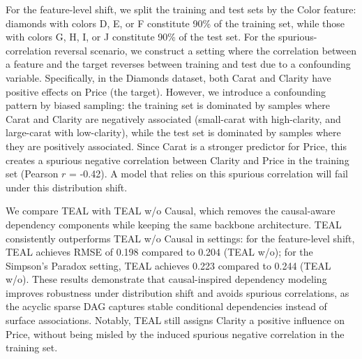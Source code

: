 \documentclass[conference]{IEEEtran}
\newcommand{\rln}[1]{{\color{black}#1}}
\newcommand{\rlend}[1]{{\color{black}#1}}
\newcommand{\rlx}[1]{\color{black}#1}
\newcommand{\syfix}[1]{{\color{black}#1}}
\newcommand{\syic}[1]{{\color{black}#1}}
\newcommand*{\ourmodel}{TEAL}
\begin{document}
\rln{
For the feature-level shift, we split the training and test sets by the Color feature: diamonds with colors D, E, or F constitute 90\% of the training set, while those with colors G, H, I, or J constitute 90\% of the test set. 
\rlx{
For the spurious-correlation reversal scenario, we construct a setting where the correlation between a feature and the target reverses between training and test due to a confounding variable. 
Specifically, in the Diamonds dataset, both Carat and Clarity have positive \syic{effects} on Price (the target). 
However, we introduce a confounding pattern by biased sampling: the training set is dominated by samples where Carat and Clarity are negatively associated (small-carat with high-clarity, and large-carat with low-clarity), while the test set is dominated by samples where they are positively associated. 
Since Carat is a stronger predictor for Price, this creates a spurious negative correlation between Clarity and Price in the training set (Pearson $r$ = -0.42).
A model that relies on this spurious correlation will fail under this distribution shift. 
}
}

\rlend{
We compare \ourmodel{} with \ourmodel{} w/o Causal, which removes the \syic{causal-aware dependency} components while keeping the same backbone architecture. \ourmodel{} consistently outperforms \ourmodel{} w/o Causal in settings: for the feature-level shift, \ourmodel{} achieves RMSE of 0.198 compared to 0.204 (\ourmodel{} w/o); for the Simpson's Paradox setting, \ourmodel{} achieves 0.223 compared to 0.244 (\ourmodel{} w/o). 
These results demonstrate that \syic{causal-inspired dependency modeling} improves robustness under distribution shift and avoids spurious correlations}\syfix{, as the acyclic sparse DAG captures \syic{stable conditional dependencies} instead of surface associations.} 
\rlx{Notably, \ourmodel{}
\syic{still assigns Clarity a positive influence on}
Price, without being misled by the induced spurious negative correlation in the training set.} 
\end{document}
